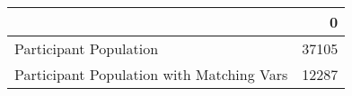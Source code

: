\begin{tabular}{lr}
\toprule
{} &      0 \\
\midrule
Participant Population                    &  37105 \\
Participant Population with Matching Vars &  12287 \\
\bottomrule
\end{tabular}
